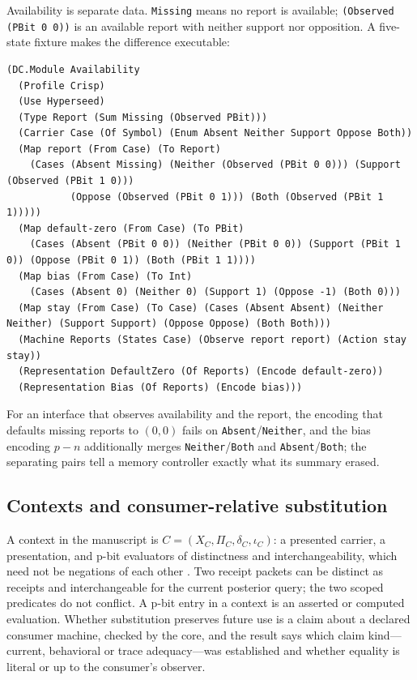 \documentclass[11pt]{article}
\newcommand{\code}[1]{\texttt{#1}}
\theoremstyle{definition}
\theoremstyle{plain}
\begin{document}
Availability is separate data. \code{Missing} means no report is available;
\code{(Observed (PBit 0 0))} is an available report with neither support nor opposition. A
five-state fixture makes the difference executable:
\begin{lstlisting}[basicstyle=\ttfamily\footnotesize,title={\scriptsize\ttfamily fixtures/availability.metta}]
(DC.Module Availability
  (Profile Crisp)
  (Use Hyperseed)
  (Type Report (Sum Missing (Observed PBit)))
  (Carrier Case (Of Symbol) (Enum Absent Neither Support Oppose Both))
  (Map report (From Case) (To Report)
    (Cases (Absent Missing) (Neither (Observed (PBit 0 0))) (Support (Observed (PBit 1 0)))
           (Oppose (Observed (PBit 0 1))) (Both (Observed (PBit 1 1)))))
  (Map default-zero (From Case) (To PBit)
    (Cases (Absent (PBit 0 0)) (Neither (PBit 0 0)) (Support (PBit 1 0)) (Oppose (PBit 0 1)) (Both (PBit 1 1))))
  (Map bias (From Case) (To Int)
    (Cases (Absent 0) (Neither 0) (Support 1) (Oppose -1) (Both 0)))
  (Map stay (From Case) (To Case) (Cases (Absent Absent) (Neither Neither) (Support Support) (Oppose Oppose) (Both Both)))
  (Machine Reports (States Case) (Observe report report) (Action stay stay))
  (Representation DefaultZero (Of Reports) (Encode default-zero))
  (Representation Bias (Of Reports) (Encode bias)))
\end{lstlisting}
For an interface that observes availability and the report, the encoding that defaults missing
reports to $(0,0)$ fails on \code{Absent}/\code{Neither}, and the bias encoding $p-n$ additionally
merges \code{Neither}/\code{Both} and \code{Absent}/\code{Both}; the separating pairs tell a memory
controller exactly what its summary erased.

\subsection{Contexts and consumer-relative substitution}

A context in the manuscript is $C=(X_C,\Pi_C,\delta_C,\iota_C)$: a presented carrier, a presentation,
and p-bit evaluators of distinctness and interchangeability, which need not be negations of each
other \cite{hyperseed}. Two receipt packets can be distinct as receipts and interchangeable for the
current posterior query; the two scoped predicates do not conflict. A p-bit entry in a context is an
asserted or computed evaluation. Whether substitution preserves future use is a claim about a
declared consumer machine, checked by the core, and the result says which claim kind---current,
behavioral or trace adequacy---was established and whether equality is literal or up to the
consumer's observer.
\end{document}
